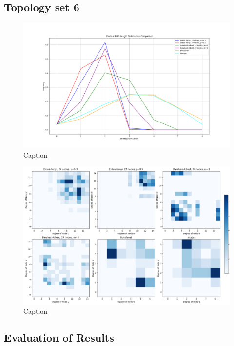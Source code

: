 \subsection{Topology set 6}
\begin{figure}
    \centering
    \includegraphics[width=0.9\linewidth]{images/FINAL-TOPO-COMP/line-27.png}
    \caption{Caption}
    \label{fig:enter-label}
\end{figure}

\begin{figure}
    \centering
    \includegraphics[width=0.9\linewidth]{images/FINAL-TOPO-COMP/Degree-correlation-matrices/27-matrix.png}
    \caption{Caption}
    \label{fig:enter-label}
\end{figure}

\subsection{Evaluation of Results}